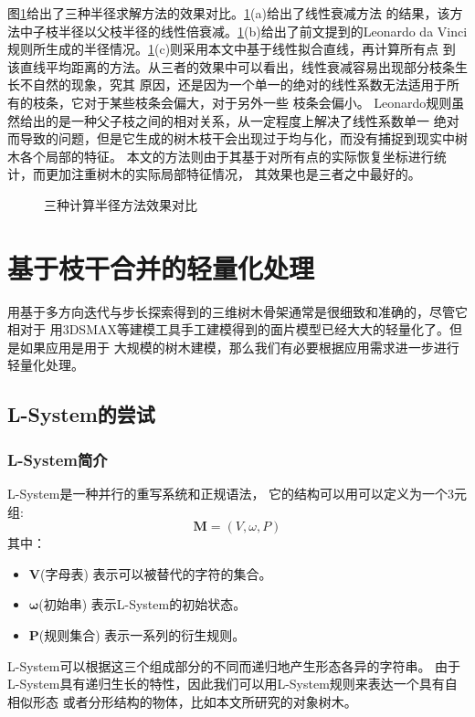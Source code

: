 图\ref{fig:radius}给出了三种半径求解方法的效果对比。\ref{fig:radius}(a)给出了线性衰减方法
的结果，该方法中子枝半径以父枝半径的线性倍衰减。\ref{fig:radius}(b)给出了前文提到的Leonardo
 da Vinci规则所生成的半径情况。\ref{fig:radius}(c)则采用本文中基于线性拟合直线，再计算所有点
 到该直线平均距离的方法。从三者的效果中可以看出，线性衰减容易出现部分枝条生长不自然的现象，究其
 原因，还是因为一个单一的绝对的线性系数无法适用于所有的枝条，它对于某些枝条会偏大，对于另外一些
 枝条会偏小。 Leonardo规则虽然给出的是一种父子枝之间的相对关系，从一定程度上解决了线性系数单一
 绝对而导致的问题，但是它生成的树木枝干会出现过于均与化，而没有捕捉到现实中树木各个局部的特征。
 本文的方法则由于其基于对所有点的实际恢复坐标进行统计，而更加注重树木的实际局部特征情况，
 其效果也是三者之中最好的。
 \begin{figure}[H]
	\centering
	\hspace{4em}
	\hspace{4em}
	\hspace{4em}
	\hspace{4em}
	\caption{三种计算半径方法效果对比}
	\label{fig:radius}
\end{figure}

\section{基于枝干合并的轻量化处理}
\label{sec:branchcombine}
用基于多方向迭代与步长探索得到的三维树木骨架通常是很细致和准确的，尽管它相对于
用3DSMAX等建模工具手工建模得到的面片模型已经大大的轻量化了。但是如果应用是用于
大规模的树木建模，那么我们有必要根据应用需求进一步进行轻量化处理。

\subsection{L-System的尝试}
\label{subsec:lsystem}

\subsubsection{L-System简介}
L-System是一种并行的重写系统和正规语法，
它的结构可以用可以定义为一个3元组:\\
\[\mathbf{M} = (V, \omega, P)\]
其中：\\
\begin{itemize}
	\item $\mathbf{V}$(字母表) 表示可以被替代的字符的集合。
	\item $\mathbf{\omega}$(初始串) 表示L-System的初始状态。
	\item $\mathbf{P}$(规则集合) 表示一系列的衍生规则。
\end{itemize}
L-System可以根据这三个组成部分的不同而递归地产生形态各异的字符串。
由于L-System具有递归生长的特性，因此我们可以用L-System规则来表达一个具有自相似形态
或者分形结构的物体，比如本文所研究的对象\raisebox{0.5mm}{------}树木。

